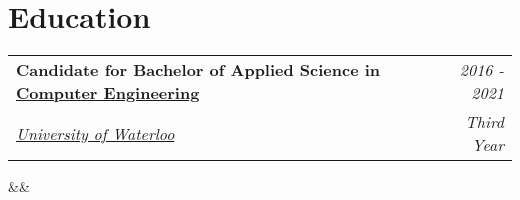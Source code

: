 \documentclass[11.9pt,letterpaper,sans]{moderncv}
\makeatletter
\renewcommand*{\cventry}[7][.25em]{
  \begin{tabular*}{\textwidth}{l@{\extracolsep{\fill}}r}%
      {\bfseries #3\ifthenelse{\equal{#6}{}}{}{, #6}} & {\itshape #2}\\%
      {\itshape #4} & {\itshape #5}\\%
  \end{tabular*}%
  \ifx&#7&%
    \else{\\\vbox{\small#7}}\fi%
  \par\addvspace{#1}}
\makeatother
\begin{document}
	\fi

	\vspace*{-0.5cm}

\setlength{\hintscolumnwidth}{0.1\textwidth}


\section{\textbf{Education}}
\setlength{\hintscolumnwidth}{0.15\textwidth}
\renewcommand*{\cvitem}[3][.2em]{%
  \begin{tabular}{@{}p{\maincolumnwidth}@{\hspace{\separatorcolumnwidth}}p{\hintscolumnwidth}@{}}%
    {#3} &\raggedleft\hintstyle{#2}%
  \end{tabular}%
  \par\addvspace{#1}}

\cventry{\textcolor{color1}{2016 - 2021}}{Candidate for Bachelor of Applied Science in \href{https://uwaterloo.ca/electrical-computer-engineering/future-undergraduate-students/computer-engineering}{Computer Engineering}}{\protect\hspace{2px}\href{http://uwaterloo.ca}{University of Waterloo}}{Third Year}{}{}




\end{document}
